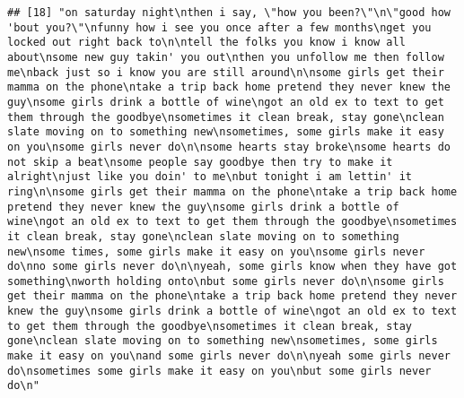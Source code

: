 \documentclass[]{article}
\begin{document}
\begin{verbatim}
## [18] "on saturday night\nthen i say, \"how you been?\"\n\"good how 'bout you?\"\nfunny how i see you once after a few months\nget you locked out right back to\n\ntell the folks you know i know all about\nsome new guy takin' you out\nthen you unfollow me then follow me\nback just so i know you are still around\n\nsome girls get their mamma on the phone\ntake a trip back home pretend they never knew the guy\nsome girls drink a bottle of wine\ngot an old ex to text to get them through the goodbye\nsometimes it clean break, stay gone\nclean slate moving on to something new\nsometimes, some girls make it easy on you\nsome girls never do\n\nsome hearts stay broke\nsome hearts do not skip a beat\nsome people say goodbye then try to make it alright\njust like you doin' to me\nbut tonight i am lettin' it ring\n\nsome girls get their mamma on the phone\ntake a trip back home pretend they never knew the guy\nsome girls drink a bottle of wine\ngot an old ex to text to get them through the goodbye\nsometimes it clean break, stay gone\nclean slate moving on to something new\nsome times, some girls make it easy on you\nsome girls never do\nno some girls never do\n\nyeah, some girls know when they have got something\nworth holding onto\nbut some girls never do\n\nsome girls get their mamma on the phone\ntake a trip back home pretend they never knew the guy\nsome girls drink a bottle of wine\ngot an old ex to text to get them through the goodbye\nsometimes it clean break, stay gone\nclean slate moving on to something new\nsometimes, some girls make it easy on you\nand some girls never do\n\nyeah some girls never do\nsometimes some girls make it easy on you\nbut some girls never do\n"                                                                                                                                                                                                                                                                                                                                                                                                                                                                                                                                                                                                                                                                                                                                                                                                                                                                                                                                                                                                                                                                                                                                                                                                                         

\end{verbatim}
\end{document}
